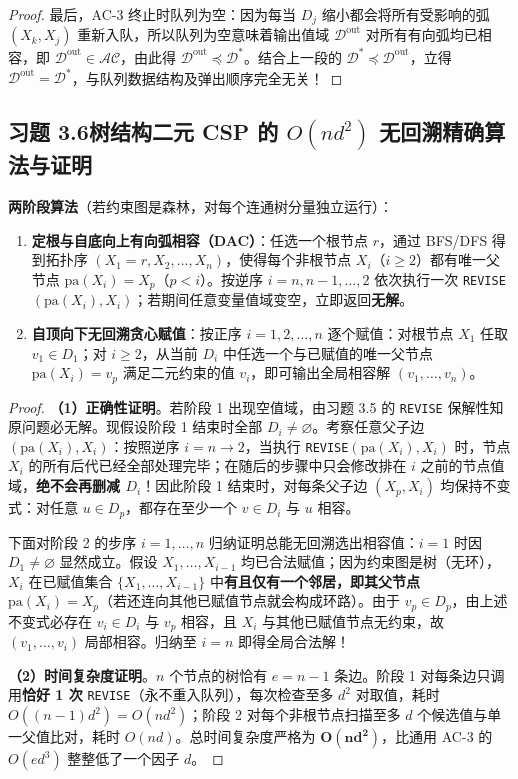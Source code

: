 \begin{proof}
最后，AC-3 终止时队列为空：因为每当 $D_j$ 缩小都会将所有受影响的弧 $(X_k, X_j)$ 重新入队，所以队列为空意味着输出值域 $\mathcal{D}^{\text{out}}$ 对所有有向弧均已相容，即 $\mathcal{D}^{\text{out}} \in \mathcal{AC}$，由此得 $\mathcal{D}^{\text{out}} \preceq \mathcal{D}^*$。结合上一段的 $\mathcal{D}^* \preceq \mathcal{D}^{\text{out}}$，立得 $\mathcal{D}^{\text{out}} = \mathcal{D}^*$，与队列数据结构及弹出顺序完全无关！
\end{proof}

\subsection*{习题 3.6\quad 树结构二元 CSP 的 $O(n d^2)$ 无回溯精确算法与证明}
\textbf{两阶段算法}（若约束图是森林，对每个连通树分量独立运行）：
\begin{enumerate}[label=\textbf{阶段 \arabic*:}, leftmargin=4.2em]
  \item \textbf{定根与自底向上有向弧相容（DAC）}：任选一个根节点 $r$，通过 BFS/DFS 得到拓扑序 $(X_1=r, X_2, \dots, X_n)$，使得每个非根节点 $X_i$（$i\ge 2$）都有唯一父节点 $\mathrm{pa}(X_i) = X_p$（$p < i$）。按逆序 $i = n, n-1, \dots, 2$ 依次执行一次 \texttt{REVISE}$(\mathrm{pa}(X_i), X_i)$；若期间任意变量值域变空，立即返回\textbf{无解}。
  \item \textbf{自顶向下无回溯贪心赋值}：按正序 $i = 1, 2, \dots, n$ 逐个赋值：对根节点 $X_1$ 任取 $v_1 \in D_1$；对 $i \ge 2$，从当前 $D_i$ 中任选一个与已赋值的唯一父节点 $\mathrm{pa}(X_i) = v_p$ 满足二元约束的值 $v_i$，即可输出全局相容解 $(v_1, \dots, v_n)$。
\end{enumerate}

\begin{proof}
\textbf{（1）正确性证明}。若阶段 1 出现空值域，由习题 3.5 的 \texttt{REVISE} 保解性知原问题必无解。现假设阶段 1 结束时全部 $D_i \neq \varnothing$。考察任意父子边 $(\mathrm{pa}(X_i), X_i)$：按照逆序 $i=n\to 2$，当执行 \texttt{REVISE}$(\mathrm{pa}(X_i), X_i)$ 时，节点 $X_i$ 的所有后代已经全部处理完毕；在随后的步骤中只会修改排在 $i$ 之前的节点值域，\textbf{绝不会再删减 $D_i$}！因此阶段 1 结束时，对每条父子边 $(X_p, X_i)$ 均保持不变式：对任意 $u \in D_p$，都存在至少一个 $v \in D_i$ 与 $u$ 相容。

下面对阶段 2 的步序 $i=1,\dots,n$ 归纳证明总能无回溯选出相容值：$i=1$ 时因 $D_1 \neq \varnothing$ 显然成立。假设 $X_1,\dots,X_{i-1}$ 均已合法赋值；因为约束图是树（无环），$X_i$ 在已赋值集合 $\{X_1,\dots,X_{i-1}\}$ 中\textbf{有且仅有一个邻居，即其父节点 $\mathrm{pa}(X_i) = X_p$}（若还连向其他已赋值节点就会构成环路）。由于 $v_p \in D_p$，由上述不变式必存在 $v_i \in D_i$ 与 $v_p$ 相容，且 $X_i$ 与其他已赋值节点无约束，故 $(v_1,\dots,v_i)$ 局部相容。归纳至 $i=n$ 即得全局合法解！

\textbf{（2）时间复杂度证明}。$n$ 个节点的树恰有 $e = n - 1$ 条边。阶段 1 对每条边只调用\textbf{恰好 1 次} \texttt{REVISE}（永不重入队列），每次检查至多 $d^2$ 对取值，耗时 $O((n-1)d^2) = O(n d^2)$；阶段 2 对每个非根节点扫描至多 $d$ 个候选值与单一父值比对，耗时 $O(nd)$。总时间复杂度严格为 $\mathbf{O(n d^2)}$，比通用 AC-3 的 $O(e d^3)$ 整整低了一个因子 $d$。
\end{proof}

